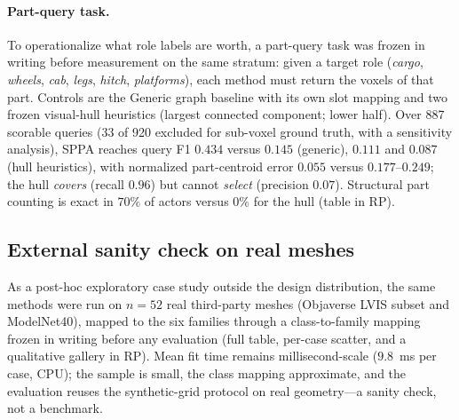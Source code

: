 \documentclass[11pt,a4paper]{article}
\begin{document}
\paragraph{Part-query task.}
To operationalize what role labels are worth, a part-query task was frozen in
writing before measurement on the same stratum: given a target role
(\emph{cargo}, \emph{wheels}, \emph{cab}, \emph{legs}, \emph{hitch},
\emph{platforms}), each method must return the voxels of that part. Controls
are the Generic graph baseline with its own slot mapping and two frozen visual-hull
heuristics (largest connected component; lower half). Over 887 scorable
queries (33 of 920 excluded for sub-voxel ground truth, with a sensitivity
analysis), SPPA reaches
query F1 \(0.434\) versus \(0.145\) (generic), \(0.111\) and \(0.087\) (hull
heuristics), with normalized part-centroid error \(0.055\) versus
\(0.177\)--\(0.249\); the hull \emph{covers} (recall \(0.96\)) but cannot
\emph{select} (precision \(0.07\)). Structural part counting is exact in
\(70\%\) of actors versus \(0\%\) for the hull (table in RP).

\subsection{External sanity check on real meshes}
\label{sec:external-sanity}

As a post-hoc exploratory case study outside the design distribution, the
same methods were run on \(n{=}52\) real third-party meshes (Objaverse LVIS
subset and ModelNet40), mapped to the six families through a class-to-family
mapping frozen in writing before any evaluation (full table, per-case
scatter, and a qualitative gallery in RP). Mean fit
time remains millisecond-scale (\(9.8\)~ms per case, CPU); the sample is
small, the class mapping approximate, and the evaluation reuses the
synthetic-grid protocol on real geometry---a sanity check, not a benchmark.
\end{document}
